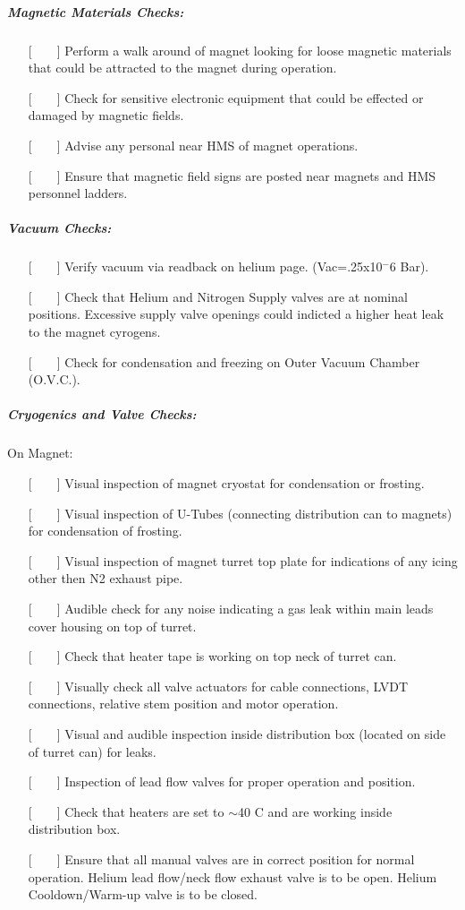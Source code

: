 \subparagraph{Magnetic Materials Checks:}

\begin{itemize}
\item[{[~~~~]}]{Perform a walk around of magnet looking for loose magnetic
materials that could be attracted to the magnet during operation.}
\item[{[~~~~]}]{Check for sensitive electronic equipment that could be
effected or damaged by magnetic fields.}
\item[{[~~~~]}]{Advise any personal near HMS of magnet operations.}
\item[{[~~~~]}]{Ensure that magnetic field signs are posted near magnets
and HMS personnel ladders.}
\end{itemize}


\subparagraph{Vacuum Checks:}

\begin{itemize}
\item[{[~~~~]}]{Verify vacuum via readback on helium page.  (Vac=.25x10${^-6}$ Bar).}
\item[{[~~~~]}]{Check that Helium and Nitrogen Supply valves are at nominal
positions.  Excessive supply valve openings could indicted a higher heat
leak to the magnet cyrogens.}
\item[{[~~~~]}]{Check for condensation and freezing on Outer Vacuum
Chamber (O.V.C.).}
\end{itemize}

\subparagraph{Cryogenics and Valve Checks:}

\noindent On Magnet:

\begin{itemize}
\item[{[~~~~]}]{Visual inspection of magnet cryostat for condensation or frosting.}
\item[{[~~~~]}]{Visual inspection of U-Tubes (connecting distribution can to
magnets) for condensation of frosting.}
\item[{[~~~~]}]{Visual inspection of magnet turret top plate for indications
of any icing other then N2 exhaust pipe.}
\item[{[~~~~]}]{Audible check for any noise indicating a gas leak within main
leads cover housing on top of turret.}
\item[{[~~~~]}]{Check that heater tape is working on top neck of turret can.}
\item[{[~~~~]}]{Visually check all valve actuators for cable connections, LVDT
connections, relative stem position and motor operation.}
\item[{[~~~~]}]{Visual and audible inspection inside distribution box
(located on side of turret can) for leaks.}
\item[{[~~~~]}]{Inspection of lead flow valves for proper operation and position.}
\item[{[~~~~]}]{Check that heaters are set to $\sim$40 C and are working inside
distribution box.}
\item[{[~~~~]}]{Ensure that all manual valves are in correct position for normal
operation.  Helium lead flow/neck flow exhaust valve is to be open. Helium
Cooldown/Warm-up valve is to be closed.}
\end{itemize}

